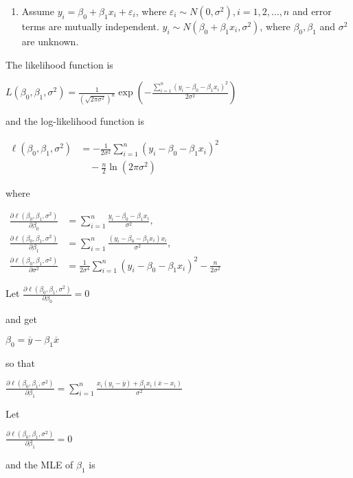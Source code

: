 \documentclass[11pt]{article}
\providecommand{\tightlist}{%
      \setlength{\itemsep}{0pt}\setlength{\parskip}{0pt}}
\begin{document}
    \begin{enumerate}
\def\labelenumi{(\alph{enumi})}
\tightlist
\item
  Assume \(y_i = \beta_0 + \beta_1 x_i + \varepsilon_i\), where
  \(\varepsilon_i \sim N(0, \sigma^2), i = 1, 2, \ldots, n\) and error
  terms are mutually independent.
  \(y_i \sim N(\beta_0 + \beta_1 x_i, \sigma^2)\), where
  \(\beta_0, \beta_1\) and \(\sigma^2\) are unknown.
\end{enumerate}

The likelihood function is

\(L(\beta_0, \beta_1, \sigma^2) = \frac{1}{(\sqrt{2\pi\sigma^2})^n} \exp \left( -\frac{\sum_{i=1}^n (y_i - \beta_0 - \beta_1 x_i)^2}{2\sigma^2} \right)\)

and the log-likelihood function is

\(\begin{align*}
\ell(\beta_0, \beta_1, \sigma^2) &= -\frac{1}{2\sigma^2} \sum_{i=1}^n (y_i - \beta_0 - \beta_1 x_i)^2 \\
&\quad - \frac{n}{2}\ln(2\pi\sigma^2)
\end{align*}\)

where

\(\begin{align*}
\frac{\partial \ell(\beta_0, \beta_1, \sigma^2)}{\partial \beta_0} &= \sum_{i=1}^n \frac{y_i - \beta_0 - \beta_1 x_i}{\sigma^2}, \\
\frac{\partial \ell(\beta_0, \beta_1, \sigma^2)}{\partial \beta_1} &= \sum_{i=1}^n \frac{(y_i - \beta_0 - \beta_1 x_i)x_i}{\sigma^2}, \\
\frac{\partial \ell(\beta_0, \beta_1, \sigma^2)}{\partial \sigma^2} &= \frac{1}{2\sigma^4} \sum_{i=1}^n (y_i - \beta_0 - \beta_1 x_i)^2 - \frac{n}{2\sigma^2}
\end{align*}\)

Let
\(\frac{\partial \ell(\beta_0, \beta_1, \sigma^2)}{\partial \beta_0} = 0\)

and get

\(\beta_0 = \overline{y} - \beta_1 \overline{x}\)

so that

\(\frac{\partial \ell(\beta_0, \beta_1, \sigma^2)}{\partial \beta_1} = \sum_{i=1}^n \frac{x_i(y_i - \overline{y}) + \beta_1 x_i (\overline{x} - x_i)}{\sigma^2}\)

Let

\(\frac{\partial \ell(\beta_0, \beta_1, \sigma^2)}{\partial \beta_1} = 0\)

and the MLE of \(\beta_1\) is
\end{document}
